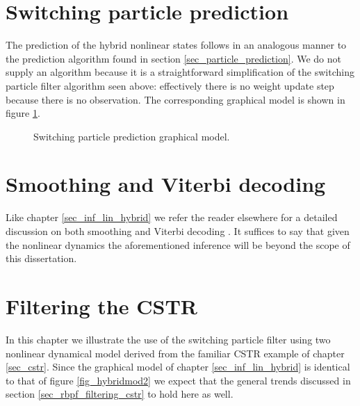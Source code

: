 \section{Switching particle prediction}
The prediction of the hybrid nonlinear states follows in an analogous manner to the prediction algorithm found in section \ref{sec_particle_prediction}. We do not supply an algorithm because it is a straightforward simplification of the switching particle filter algorithm seen above: effectively there is no weight update step because there is no observation. The corresponding graphical model is shown in figure \ref{fig_hybridmod2_prediction}.
\begin{figure}[H] 
\centering
{}
\caption{Switching particle prediction graphical model.}
\label{fig_hybridmod2_prediction}
\end{figure}  

\section{Smoothing and Viterbi decoding}
Like chapter \ref{sec_inf_lin_hybrid} we refer the reader elsewhere for a detailed discussion on both smoothing and Viterbi decoding \cite{murphy1}. It suffices to say that given the nonlinear dynamics the aforementioned inference will be beyond the scope of this dissertation. 

\section{Filtering the CSTR}
\label{sec_spf_filtering}
In this chapter we illustrate the use of the switching particle filter using  two nonlinear dynamical model derived from the familiar CSTR example of chapter \ref{sec_cstr}. Since the graphical model of chapter \ref{sec_inf_lin_hybrid} is identical to that of figure \ref{fig_hybridmod2} we expect that the general trends discussed in section \ref{sec_rbpf_filtering_cstr} to hold here as well.


